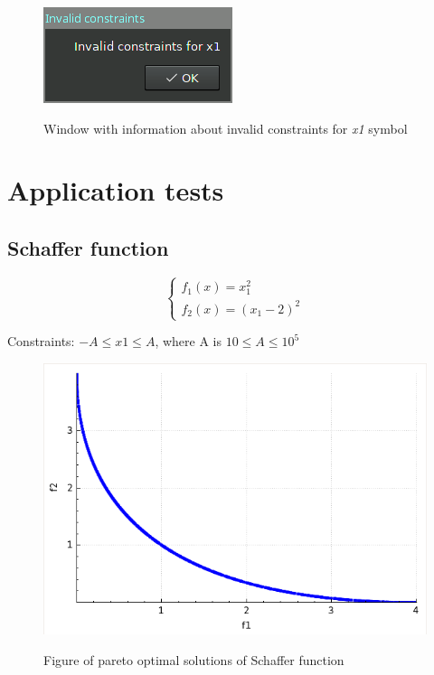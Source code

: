 \documentclass[a4paper, 11pt]{article}
\begin{document}
	\begin{figure}[H]
	\caption{Window with information about invalid constraints for \textit{x1} symbol}
	\centering
	\includegraphics[scale=0.8]{constraints.png}
	\label{fig:constraints}
	\end{figure}	
	
	\newpage
	\section{Application tests}

	\subsection{Schaffer function}
	$$\begin{cases}
		f_{1}(x)=x_{1}^{2}\\
		f_{2}(x)=(x_{1}-2)^{2}
	\end{cases}$$
		
	Constraints: $-A \leq x1 \leq A$, where A is $10 \leq A \leq 10^{5}$
		
	\begin{figure}[H]
	\caption{Figure of pareto optimal solutions of Schaffer function}
	\centering
	\includegraphics[scale=0.4]{schaffer}
	\label{fig:schaffer}
	\end{figure}
	
\end{document}
